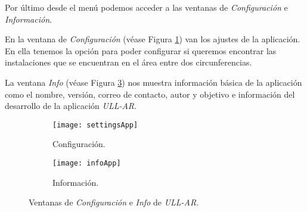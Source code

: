 
Por último desde el menú podemos acceder a las ventanas de \textit{Configuración} e \textit{Información}.

En la ventana de \textit{Configuración} (véase Figura \ref{fig:settingsApp}) van los ajustes de la aplicación. En ella tenemos la opción para poder configurar si queremos encontrar las instalaciones que se encuentran en el área entre dos circunferencias.

La ventana \textit{Info} (véase Figura \ref{fig:infoApp}) nos muestra información básica de la aplicación como el nombre, versión, correo de contacto, autor y objetivo e información del desarrollo de la aplicación \textit{ULL-AR}. 

\begin{figure}[h]
    \hspace*{\fill}%
    \begin{subfigure}[h]{0.35\linewidth}
    \texttt{[image: settingsApp]}
    \caption{Configuración.}
    \label{fig:settingsApp}
    \end{subfigure}
    \hfill%
    \begin{subfigure}[h]{0.35\linewidth}
    \texttt{[image: infoApp]}
    \caption{Información.}
    \label{fig:infoApp}
    \end{subfigure}%
    \caption{Ventanas de \textit{Configuración} e \textit{Info} de \textit{ULL-AR}.}
    \hspace*{\fill}%
\end{figure}
















% 



